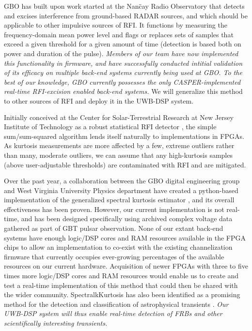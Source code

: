 \documentclass[10pt]{myNSF}
\begin{document}
 GBO has built upon
work started at the Nan\"{c}ay Radio Observatory \citep{dwr17} that
detects and excises interference from ground-based RADAR sources, and
which should be applicable to other impulsive sources of RFI.  It
functions by measuring the frequency-domain mean power level and flags
or replaces sets of samples that exceed a given threshold for a given
amount of time (detection is based both on power and duration of the
pulse).  \emph{Members of our team have now implemented this
  functionality in firmware, and have successfully conducted intitial
  validation of its efficacy on multiple back-end systems currently
  being used at GBO.  To the best of our knowledge, GBO currently
  possesses the only CASPER-implemented real-time RFI-excision enabled
  back-end systems.}  We will generalize this method to other sources
of RFI and deploy it in the UWB-DSP system.

 Initially conceived at the Center for
Solar-Terrestrial Research at New Jersey Institute of Technology as a
robust statistical RFI detector \citep{ng10,nhmg16}, the simple
sum/sum-squared algorithm lends itself naturally to implementations in
FPGAs.  As kurtosis measurements are more affected by a few, extreme
outliers rather than many, moderate outliers, we can assume that any
high-kurtosis samples (above user-adjustable thresholds) are
contaminated with RFI and are mitigated.  

Over the past year, a collaboration between the GBO digital
engineering group and West Virginia University Physics department have
created a python-based implementation of the generalized spectral
kurtosis estimator \citep{ng10}, and its overall effectiveness has
been proven. However, our current implementation is not real-time, and
has been designed specifically using archived complex voltage data
gathered as part of GBT pulsar observation.  None of our extant
back-end systems have enough logic/DSP cores and RAM resources
available in the FPGA chips to allow an implementation to co-exist
with the existing channelization firmware that currently occupies
ever-growing percentages of the available resources on our current
hardware. Acquisition of newer FPGAs with three to five times more
logic/DSP cores and RAM resources would enable us to create and test a
real-time implementation of this method that could then be shared with
the wider community.  SpectralkKurtosis has also been identified as a
promising method for the detection and classification of astrophysical
transients \cite{nhmg16}.  \emph{Our UWB-DSP system will thus enable
  real-time detection of FRBs and other scientifically interesting
  transients.}
\end{document}
